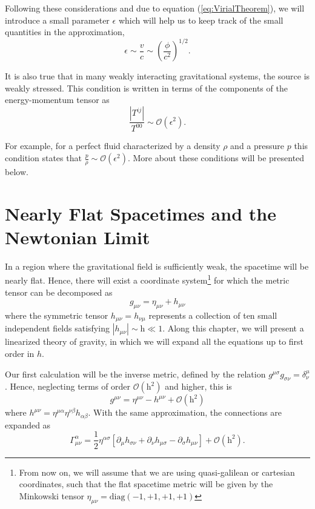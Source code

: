 Following these considerations and due to equation (\ref{eq:VirialTheorem}), we will introduce a small parameter $\epsilon$ which will help us to keep track of the small quantities in the approximation,
\begin{equation}
\epsilon \sim \frac{v}{c} \sim \left( \frac{\phi}{c^2}\right)^{1/2}. \label{eq:EpsilonDefinition}
\end{equation}

It is also true that in many weakly interacting gravitational systems, the source is weakly stressed. This condition is written in terms of the components of the energy-momentum tensor as
\begin{equation}
\frac{\left| T^{ij} \right|}{T^{00}} \sim \mathcal{O} (\epsilon^2). \label{eq:EnergyMomentumCondition}
\end{equation}

For example, for a perfect fluid characterized by a density $\rho$ and a pressure $p$ this condition states that $\frac{p}{\rho} \sim \mathcal{O} (\epsilon ^2)$. More about these conditions will be presented below.

\section{Nearly Flat Spacetimes and the Newtonian Limit}

In a region where the gravitational field is sufficiently weak, the spacetime will be nearly flat. Hence, there will exist a coordinate system\footnote{From now on, we will assume that we are using quasi-galilean or cartesian coordinates, such that the flat spacetime metric will be given by the Minkowski tensor $\eta_{\mu \nu} = \text{diag} (-1, +1, +1, +1) $} for which the metric tensor can be decomposed as
\begin{equation}
g_{\mu \nu} = \eta_{\mu \nu} + h_{\mu \nu} \label{eq:PerturbedMetricTensor}
\end{equation}
where the symmetric tensor $h_{\mu \nu} = h_{\nu \mu}$ represents a collection of ten small independent fields satisfying $\left| h_{\mu \nu} \right| \sim \textrm{h} \ll 1$. Along this chapter, we will present a linearized theory of gravity, in which we will expand all the equations up to first order in $h$. 

Our first calculation will be the inverse metric, defined by the relation $g^{\mu \sigma} g_{\sigma \nu} = \delta^\mu _\nu$. Hence, neglecting terms of order $\mathcal{O} ( \textrm{h}^2 )$ and higher, this is
\begin{equation}
g^{\mu \nu} = \eta^{\mu \nu} - h^{\mu \nu} + \mathcal{O} ( \textrm{h}^2 )
\end{equation}
where $h^{\mu \nu} = \eta^{\mu \alpha} \eta^{\nu \beta} h_{\alpha \beta} $. With the same approximation, the connections are expanded as
\begin{equation}
\Gamma ^{\alpha}_{\mu \nu} = \frac{1}{2} \eta^{\alpha \sigma} \left[ \partial _\mu h_{\sigma \nu} + \partial _\nu h_{\mu \sigma} - \partial _\sigma h_{\mu \nu}\right] + \mathcal{O} ( \textrm{h}^2 ).\label{eq:LinearizedConnections}
\end{equation}

